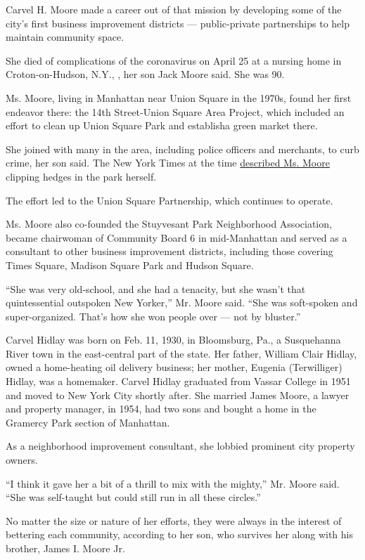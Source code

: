 Carvel H. Moore made a career out of that mission by developing some of
the city's first business improvement districts --- public-private
partnerships to help maintain community space.

She died of complications of the coronavirus on April 25 at a nursing
home in Croton-on-Hudson, N.Y., , her son Jack Moore said. She was 90.

Ms. Moore, living in Manhattan near Union Square in the 1970s, found her
first endeavor there: the 14th Street‐Union Square Area Project, which
included an effort to clean up Union Square Park and establisha green
market there.

She joined with many in the area, including police officers and
merchants, to curb crime, her son said. The New York Times at the time
\href{https://www.nytimes3xbfgragh.onion/1977/05/19/archives/project-aimed-at-sprucing-union-square.html}{described
Ms. Moore} clipping hedges in the park herself.

The effort led to the Union Square Partnership, which continues to
operate.

Ms. Moore also co-founded the Stuyvesant Park Neighborhood Association,
became chairwoman of Community Board 6 in mid-Manhattan and served as a
consultant to other business improvement districts, including those
covering Times Square, Madison Square Park and Hudson Square.

``She was very old-school, and she had a tenacity, but she wasn't that
quintessential outspoken New Yorker,'' Mr. Moore said. ``She was
soft-spoken and super-organized. That's how she won people over --- not
by bluster.''

Carvel Hidlay was born on Feb. 11, 1930, in Bloomsburg, Pa., a
Susquehanna River town in the east-central part of the state. Her
father, William Clair Hidlay, owned a home-heating oil delivery
business; her mother, Eugenia (Terwilliger) Hidlay, was a homemaker.
Carvel Hidlay graduated from Vassar College in 1951 and moved to New
York City shortly after. She married James Moore, a lawyer and property
manager, in 1954, had two sons and bought a home in the Gramercy Park
section of Manhattan.

As a neighborhood improvement consultant, she lobbied prominent city
property owners.

``I think it gave her a bit of a thrill to mix with the mighty,'' Mr.
Moore said. ``She was self-taught but could still run in all these
circles.''

No matter the size or nature of her efforts, they were always in the
interest of bettering each community, according to her son, who survives
her along with his brother, James I. Moore Jr.

